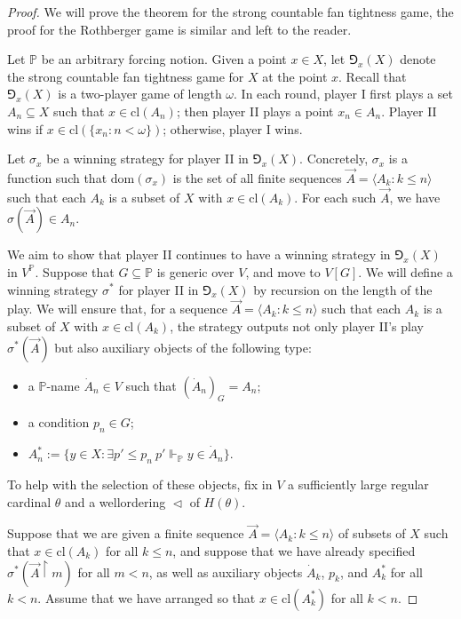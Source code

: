 \documentclass{amsart}
\theoremstyle{definition}
\newcommand{\dom}{\mathrm{dom}}
\newcommand{\bb}{\mathbb}
\renewcommand{\P}{\bb{P}}
\begin{document}
\begin{proof}
We will prove the theorem for the strong countable fan tightness game, the proof for the Rothberger game is similar and left to the reader.

  Let $\P$ be an arbitrary forcing notion. Given a point $x \in X$, let $\Game_x(X)$ denote the 
  strong countable fan tightness game for $X$ at the point $x$. Recall that $\Game_x(X)$ is a two-player game of length $\omega$. In each round, player I first plays a set $A_n \subseteq X$ such that $x \in \mathrm{cl}(A_n)$; then player II plays a point $x_n \in A_n$. Player II wins if $x \in \mathrm{cl}(\{x_n :n <\omega\})$; otherwise, player I wins.
  
  Let $\sigma_x$ be a winning strategy for player II in $\Game_x(X)$. Concretely, 
  $\sigma_x$ is a function such that $\dom(\sigma_x)$ is the set of all finite sequences 
  $\vec{A} = \langle A_k :k \leq n \rangle$ such that each $A_k$ is a subset of $X$ with 
  $x \in \mathrm{cl}(A_k)$. For each such $\vec{A}$, we have $\sigma(\vec{A}) \in A_n$.
  
  We aim to show that player II continues to have a winning strategy in $\Game_x(X)$ in 
  $V^{\P}$. Suppose that $G \subseteq \P$ is generic over $V$, and move to $V[G]$. We will 
  define a winning strategy $\sigma^*$ for player II in $\Game_x(X)$ by recursion on the 
  length of the play. We will ensure that, for a sequence $\vec{A} = \langle A_k :
  k \leq n \rangle$ such that each $A_k$ is a subset of $X$ with $x \in \mathrm{cl}(A_k)$, 
  the strategy outputs not only player II's play $\sigma^*(\vec{A})$ but also auxiliary 
  objects of the following type:
  \begin{itemize}
    \item a $\P$-name $\dot{A}_n \in V$ such that $(\dot{A}_n)_G = A_n$;
    \item a condition $p_n \in G$;
    \item $A^*_n := \{y \in X :\exists p' \leq p_n \ p' \Vdash_{\P} y \in \dot{A}_n\}$.
  \end{itemize}
  To help with the selection of these objects, fix in $V$ a sufficiently large regular cardinal 
  $\theta$ and a wellordering $\vartriangleleft$ of $H(\theta)$.
  
  Suppose that we are given a finite sequence $\vec{A} = \langle A_k :k \leq n \rangle$ 
  of subsets of $X$ such that $x \in \mathrm{cl}(A_k)$ for all $k \leq n$, and suppose that 
  we have already specified $\sigma^*(\vec{A} \restriction m)$ for all $m < n$, as well 
  as auxiliary objects $\dot{A}_k$, $p_k$, and $A^*_k$ for all $k < n$. Assume that we have 
  arranged so that $x \in \mathrm{cl}(A^*_k)$ for all $k < n$.
  

\end{proof}
\end{document}
